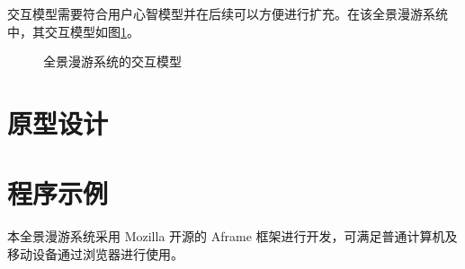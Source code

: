 交互模型需要符合用户心智模型并在后续可以方便进行扩充。在该全景漫游系统中，其交互模型如图\ref{fig:scene}。

\begin{figure}[htp]
\centering
{}
\caption{全景漫游系统的交互模型}
\label{fig:scene}
\end{figure}

\section{原型设计}


\section{程序示例}
本全景漫游系统采用 Mozilla 开源的 Aframe 框架进行开发，可满足普通计算机及移动设备通过浏览器进行使用。
